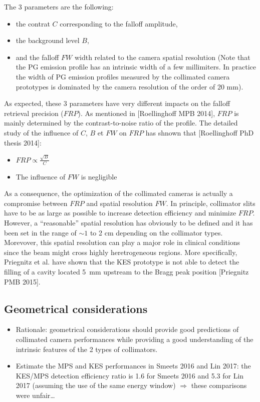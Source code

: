 \documentclass[a4paper,english]{article}
\begin{document}
The 3 parameters are the following:
\begin{itemize}
  \item the contrat $C$ corresponding to the falloff amplitude,
  \item the background level $B$,
  \item and the falloff $FW$ width related to the camera spatial resolution (Note that the PG emission profile has an intrinsic width of a few millimiters. In practice the width of PG emission profiles measured by the collimated camera prototypes is dominated by the camera resolution of the order of 20 mm).
\end{itemize}

As expected, these 3 parameters have very different impacts on the falloff retrieval precision ($FRP$). As mentioned in [Roellinghoff MPB 2014], $FRP$ is mainly determined by the contrast-to-noise ratio of the profile. The detailed study of the influence of $C$, $B$ et $FW$ on $FRP$ has shnown that [Roellinghoff PhD thesis 2014]:
\begin{itemize}
 \item $FRP\propto \frac{\sqrt{B}}{C}$
 \item The influence of $FW$ is negligible
\end{itemize}

As a consequence, the optimization of the collimated cameras is actually a compromise between $FRP$ and spatial resolution $FW$. In principle, collimator slits have to be as large as possible to increase detection efficiency and minimize $FRP$. However, a \enquote{reasonable} spatial resolution has obviously to be defined and it has been set in the range of $\sim1$ to 2 cm depending on the collimator types. Morevover, this spatial resolution can play a major role in clinical conditions since the beam might cross highly heretrogeneous regions. More specifically, Priegnitz et al. have shown that the KES prototype is not able to detect the filling of a cavity located 5~mm upstream to the Bragg peak position [Priegnitz PMB 2015].


\subsection{Geometrical considerations}



\begin{itemize}
  \item Rationale: geometrical considerations should provide good predictions of collimated camera performances while providing a good understanding of the intrinsic features of the 2 types of collimators. 
  \item Estimate the MPS and KES performances in Smeets 2016 and Lin 2017: the KES/MPS detection efficiency ratio is 1.6 for Smeets 2016 and 5.3 for Lin 2017 (assuming the use of the same energy window) $\Rightarrow$ these comparisons were unfair\dots    
\end{itemize}
\end{document}
